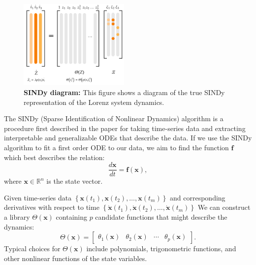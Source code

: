 \begin{figure}[H]
    \centering
    \includegraphics[width=0.48\textwidth]{project_2/images/SINDy_diagram.pdf}
    \caption{\textbf{SINDy diagram:} This figure shows a diagram of the true SINDy representation of the Lorenz system dynamics.}
    \label{fig:SINDy_diagram}
\end{figure}

The SINDy (Sparse Identification of Nonlinear Dynamics) algorithm is a procedure first described in the paper \cite{Brunton_2016} for taking time-series data and extracting interpretable and generalizable ODEs that describe the data. If we use the SINDy algorithm to fit a first order ODE to our data, we aim to find the function $\mathbf{f}$ which best describes the relation:
\begin{equation}
\frac{d \mathbf{x}}{d t}=\mathbf{f}(\mathbf{x}),
\label{eq:ode}
\end{equation}
where $\mathbf{x} \in \mathbb{R}^n$ is the state vector.%

Given time-series data $\left\{\mathbf{x}\left(t_1\right), \mathbf{x}\left(t_2\right), \ldots, \mathbf{x}\left(t_m\right)\right\}$ and corresponding derivatives with respect to time $\left\{\dot{\mathbf{x}}\left(t_1\right), \dot{\mathbf{x}}\left(t_2\right), \ldots, \dot{\mathbf{x}}\left(t_m\right)\right\}$ We can construct a library $\Theta(\mathbf{x})$ containing $p$ candidate functions that might describe the dynamics:
\begin{equation}
\Theta(\mathbf{x})=\left[\begin{array}{llll}
\theta_1(\mathbf{x}) & \theta_2(\mathbf{x}) & \cdots & \theta_p(\mathbf{x})
\end{array}\right].
\label{eq:sindy_library}
\end{equation}
Typical choices for $\Theta(\mathbf{x})$ include polynomials, trigonometric functions, and other nonlinear functions of the state variables. 

